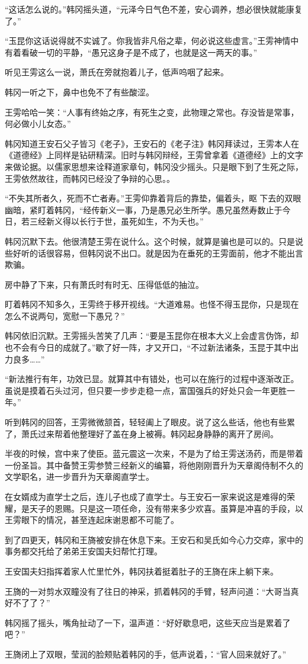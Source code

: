 “这话怎么说的。”韩冈摇头道，“元泽今日气色不差，安心调养，想必很快就能康复了。”

“玉昆你这话说得就不实诚了。你我皆非凡俗之辈，何必说这些虚言。”王雱神情中有着看破一切的平静，“愚兄这身子是不成了，也就是这一两天的事。”

听见王雱这么一说，萧氏在旁就抱着儿子，低声呜咽了起来。

韩冈一听之下，鼻中也免不了有些酸涩。

王雱哈哈一笑：“人事有终始之序，有死生之变，此物理之常也。存没皆是常事，何必做小儿女态。”

韩冈知道王安石父子皆习《老子》，王安石的《老子注》韩冈拜读过，王雱本人在《道德经》上同样是钻研精深。旧时与韩冈辩经，王雱曾拿着《道德经》上的文字来做论据。以儒家思想来诠释道家章句，韩冈没少摇头。只是眼下到了生死之际，王雱依然故往，而韩冈已经没了争辩的心思。。

“不失其所者久，死而不亡者寿。”王雱仰靠着背后的靠垫，偏着头，眍下去的双眼幽暗，紧盯着韩冈，“经传新义一事，乃是愚兄必生所学。愚兄虽然寿数止于今日，若三经新义得以长行于世，虽死如生，不为夭也。”

韩冈沉默下去。他很清楚王雱在说什么。这个时候，就算是骗也是可以的。只是说些好听的话很容易，但韩冈说不出口。就是因为在垂死的王雱面前，他才不能出言欺骗。

房中静了下来，只有萧氏时有时无、压得低低的抽泣。

盯着韩冈不知多久，王雱终于移开视线。“大道难易。也怪不得玉昆你，只是现在怎么不说两句，宽慰一下愚兄？”

韩冈依旧沉默。王雱摇头苦笑了几声：“要是玉昆你在根本大义上会虚言伪饰，却也不会有今日的成就了。”歇了好一阵，才又开口，“不过新法诸条，玉昆于其中出力良多……”

“新法推行有年，功效已显。就算其中有错处，也可以在施行的过程中逐渐改正。虽说是摸着石头过河，但只要一步步走稳一点，富国强兵的好处只会一年更胜一年。”

听到韩冈的回答，王雱微微颔首，轻轻阖上了眼皮。说了这么些话，他也有些累了，萧氏过来帮着他整理好了盖在身上被褥。韩冈起身静静的离开了房间。

半夜的时候，宫中来了使臣。蓝元震这一次来，不是为了给王雱送汤药，而是带着一份圣旨。其中备赞王雱参赞三经新义的编纂，将他刚刚晋升为天章阁侍制不久的文学职名，进一步晋升为天章阁直学士。

在女婿成为直学士之后，连儿子也成了直学士。与王安石一家来说这是难得的荣耀，是天子的恩赐。只是这一项任命，没有带来多少欢喜。虽算是冲喜的手段，以王雱眼下的情况，甚至连起床谢恩都不可能了。

到了四更天，韩冈和王旖被安排在休息下来。王安石和吴氏如今心力交瘁，家中的事务都交托给了弟弟王安国夫妇帮忙打理。

王安国夫妇指挥着家人忙里忙外，韩冈扶着挺着肚子的王旖在床上躺下来。

王旖的一对剪水双瞳没有了往日的神采，抓着韩冈的手臂，轻声问道：“大哥当真好不了了？”

韩冈摇了摇头，嘴角扯动了一下，温声道：“好好歇息吧，这些天应当是累着了吧？”

王旖闭上了双眼，莹润的脸颊贴着韩冈的手，低声说着，：“官人回来就好了。”

